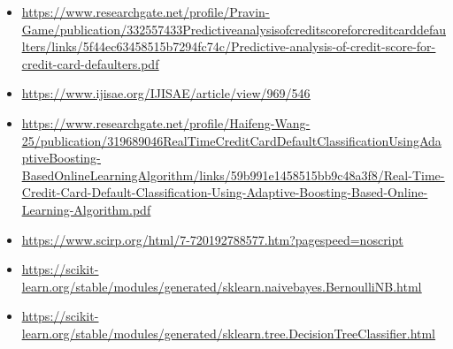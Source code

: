 \documentclass[12pt]{report}
\renewcommand{\_}{\kern-1.5pt\textunderscore\kern-1.5pt}
\begin{document}
\begin{itemize}
\vspace{\baselineskip}
	\item \href{https://www.researchgate.net/profile/Pravin-Game/publication/332557433_Predictive_analysis_of_credit_score_for_credit_card_defaulters/links/5f44ec63458515b7294fc74c/Predictive-analysis-of-credit-score-for-credit-card-defaulters.pdf}{\textcolor[HTML]{1155CC}{\ul{https://www.researchgate.net/profile/Pravin-Game/publication/332557433\_Predictive\_analysis\_of\_credit\_score\_for\_credit\_card\_defaulters/links/5f44ec63458515b7294fc74c/Predictive-analysis-of-credit-score-for-credit-card-defaulters.pdf}}}
	\item \href{https://www.ijisae.org/IJISAE/article/view/969/546}{\textcolor[HTML]{1155CC}{\ul{https://www.ijisae.org/IJISAE/article/view/969/546}}}
	\item \href{https://www.researchgate.net/profile/Haifeng-Wang-25/publication/319689046_Real_Time_Credit_Card_Default_Classification_Using_Adaptive_Boosting-Based_Online_Learning_Algorithm/links/59b991e1458515bb9c48a3f8/Real-Time-Credit-Card-Default-Classification-Using-Adaptive-Boosting-Based-Online-Learning-Algorithm.pdf}{\textcolor[HTML]{1155CC}{\ul{https://www.researchgate.net/profile/Haifeng-Wang-25/publication/319689046\_Real\_Time\_Credit\_Card\_Default\_Classification\_Using\_Adaptive\_Boosting-Based\_Online\_Learning\_Algorithm/links/59b991e1458515bb9c48a3f8/Real-Time-Credit-Card-Default-Classification-Using-Adaptive-Boosting-Based-Online-Learning-Algorithm.pdf}}}
	\item \href{https://www.scirp.org/html/7-7201927_88577.htm?pagespeed=noscript}{\textcolor[HTML]{1155CC}{\ul{https://www.scirp.org/html/7-7201927\_88577.htm?pagespeed=noscript}}}
	\item \href{https://scikit-learn.org/stable/modules/generated/sklearn.naive_bayes.BernoulliNB.html}{\textcolor[HTML]{1155CC}{\ul{https://scikit-learn.org/stable/modules/generated/sklearn.naive\_bayes.BernoulliNB.html}}}
	\item \href{https://scikit-learn.org/stable/modules/generated/sklearn.tree.DecisionTreeClassifier.html}{\textcolor[HTML]{1155CC}{\ul{https://scikit-learn.org/stable/modules/generated/sklearn.tree.DecisionTreeClassifier.html}}}
\end{itemize}

\vspace{\baselineskip}

\vspace{\baselineskip}

\vspace{\baselineskip}

\vspace{\baselineskip}

\vspace{\baselineskip}

\vspace{\baselineskip}

\vspace{\baselineskip}

\vspace{\baselineskip}
\printbibliography
\end{document}
